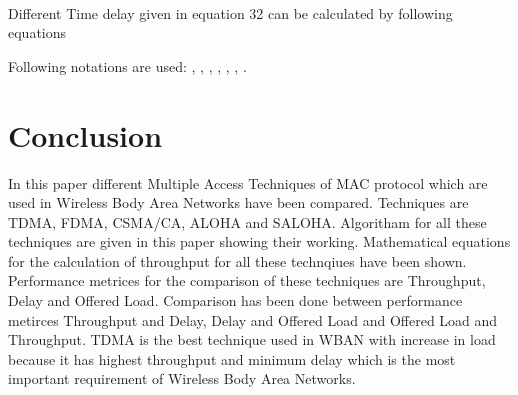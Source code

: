 \documentclass[10pt, conference, compsocconf]{IEEEtran}
\begin{document}
\\
Different Time delay given in equation 32 can be calculated by following equations


Following notations are used:         ,     ,  ,  ,   ,   ,   .
\section{Conclusion}
In this paper different Multiple Access Techniques of MAC protocol which are used in Wireless Body Area Networks have been compared. Techniques are
TDMA, FDMA, CSMA/CA, ALOHA and SALOHA. Algoritham for all these techniques are given in this paper showing their working. Mathematical equations for the calculation of throughput for all these technqiues have been shown. Performance metrices for the comparison of these techniques are Throughput, Delay and Offered Load. Comparison has been done between performance metirces Throughput and Delay, Delay and Offered Load and Offered Load and Throughput. TDMA is the best technique used in WBAN with increase in load because it has highest throughput and minimum delay which is the most important requirement of Wireless Body Area Networks.
\end{document}

